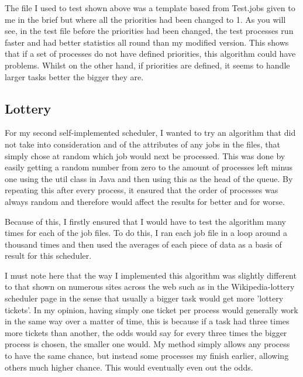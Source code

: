\documentclass{sig-alternate}
\begin{document}
The file I used to test shown above was a template based from Test.jobs given to
me in the brief but where all the priorities had been changed to 1. As you will
see, in the test file before the priorities had been changed, the test processes
run faster and had better statistics all round than my modified version. This
shows that if a set of processes do not have defined priorities, this algorithm
could have problems. Whilst on the other hand, if priorities are defined, it
seems to handle larger tasks better the bigger they are.

\subsection{Lottery}
For my second self-implemented scheduler, I wanted to try an algorithm that did
not take into consideration and of the attributes of any jobs in the files, that
simply chose at random which job would next be processed. This was done by
easily getting a random number from zero to the amount of processes left minus
one using the util class in Java and then using this as the head of the queue.
By repeating this after every process, it ensured that the order of processes
was always random and therefore would affect the results for better and for
worse.

 Because of this, I firstly ensured that I would have to test the algorithm many
times for each of the job files. To do this, I ran each job file in a loop
around a thousand times and then used the averages of each piece of data as a
basis of result for this scheduler.

I must note here that the way I implemented this algorithm was slightly different
to that shown on numerous sites across the web such as in the Wikipedia-lottery
scheduler page in the sense that usually a bigger task would
get more 'lottery tickets'. In my opinion, having simply one ticket per process
would generally work in the same way over a matter of time, this is because if a
task had three times more tickets than another, the odds would say for every
three times the bigger process is chosen, the smaller one would. My method
simply allows any process to have the same chance, but instead some processes my
finish earlier, allowing others much higher chance. This would eventually even
out the odds.
\vspace{3mm}
\end{document}
